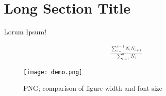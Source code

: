 \documentclass[a4paper,UTF8]{article}
\begin{document}
	\section{Long Section Title}
		
		\paragraph{}
		
		
		\paragraph{}
			
			Lorum Ipsum!

		\begin{equation} \begin{split}
			\frac{\sum_{i=1}^{n-1}N_{i}N_{i+1}}{\sum_{i=1}^{n} N_{i}}
			\label{eq:equation_label}
		\end{split} \end{equation}

		\begin{figure}[ht]
			\texttt{[image: demo.png]}
			\caption{PNG; comparison of figure width and font size}
			\label{fig:png_label}
		\end{figure}
\end{document}
